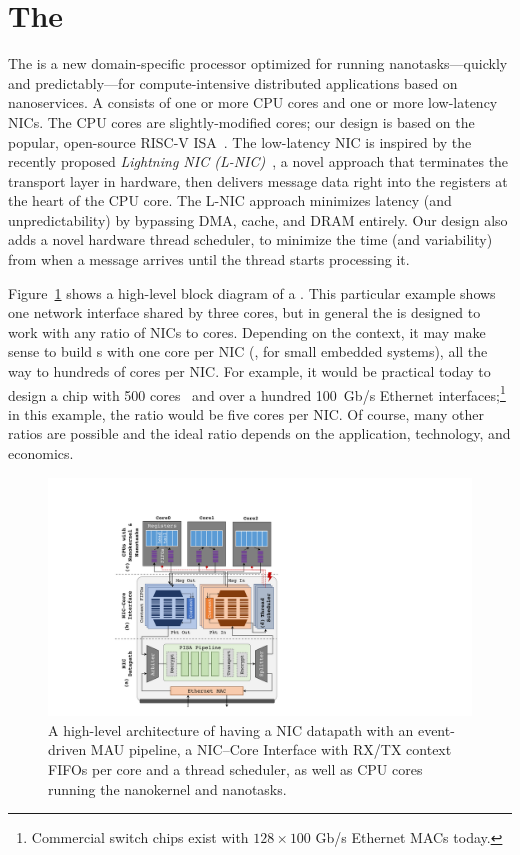 \section{The \name{}}
\label{sec:nanoPU}
The \name{} is a new domain-specific processor optimized for running nanotasks---quickly and predictably---for compute-intensive distributed applications based on nanoservices. 
A \name{} consists of one or more CPU cores and one or more low-latency NICs. 
The CPU cores are slightly-modified cores; our design is based on the popular, open-source RISC-V ISA~\cite{riscv}. 
The low-latency NIC is inspired by the recently proposed {\em Lightning NIC (L-NIC)}~\cite{lnic}, a novel approach that terminates the transport layer in hardware, then delivers message data right into the registers at the heart of the CPU core.  
The L-NIC approach minimizes latency (and unpredictability) by bypassing DMA, cache, and DRAM entirely. 
Our \name{} design also adds a novel hardware thread scheduler, to minimize the time (and variability) from when a message arrives until the thread starts processing it.

Figure~\ref{fig:nanoPU} shows a high-level block diagram of a \name{}. 
This particular example shows one network interface shared by three cores, but in general the \name{} is designed to work with any ratio of NICs to cores. 
Depending on the context, it may make sense to build \name{}s with one core per NIC (\eg, for small embedded systems), all the way to hundreds of cores per NIC. 
For example, it would be practical today to design a chip with 500 cores~\cite{celerity, kilocore} and over a hundred \SI{100}{Gb/s} Ethernet interfaces;\footnote{Commercial switch chips exist with $128\times 100$ Gb/s Ethernet MACs today.} in this example, the ratio would be five cores per NIC. 
Of course, many other ratios are possible and the ideal ratio depends on the application, technology, and economics. 

\begin{figure}
  \includegraphics[width=0.9\linewidth]{./figures/nanopu-arch}
  \caption{A high-level architecture of \name{} having a NIC datapath with an event-driven MAU pipeline, a NIC--Core Interface with RX/TX context FIFOs per core and a thread scheduler, as well as CPU cores running the nanokernel and nanotasks.}
  \label{fig:nanoPU}
\end{figure}

